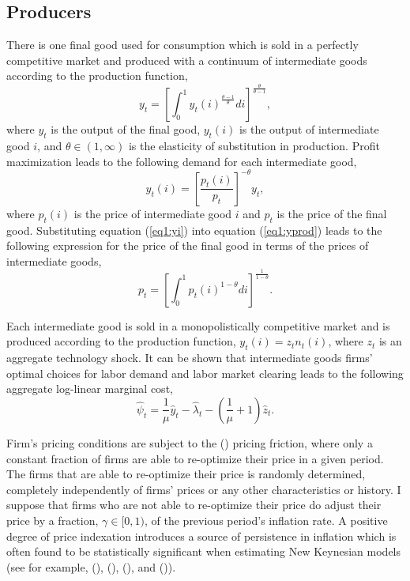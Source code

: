 \documentclass[11pt]{article}
\newcommand{\beq}{\begin{equation}}
\newcommand{\eeq}{\end{equation}}
\newcommand{\citee}[1]{\citeauthor*{#1} (\citeyear{#1})}
\newcommand{\h}[1]{\hat{#1}}
\begin{document}
\subsection{Producers}
There is one final good used for consumption which is sold in a perfectly competitive market and produced with a continuum of intermediate goods according to the production function,
\beq \label{eq1:yprod} y_t = \left[ \int_0^1 y_t(i)^{\frac{\theta-1}{\theta}} di \right]^{\frac{\theta}{\theta-1}}, \eeq
where $y_t$ is the output of the final good, $y_t(i)$ is the output of intermediate good $i$, and $\theta\in(1,\infty)$ is the elasticity of substitution in production.  Profit maximization leads to the following demand for each intermediate good,
\beq \label{eq1:yi} y_t(i) = \left[ \frac{p_t(i)}{p_t} \right]^{-\theta} y_t, \eeq
where $p_t(i)$ is the price of intermediate good $i$ and $p_t$ is the price of the final good.  Substituting equation (\ref{eq1:yi}) into equation (\ref{eq1:yprod}) leads to the following expression for the price of the final good in terms of the prices of intermediate goods,
\beq \label{eq1:pfinal} p_t = \left[ \int_0^1 p_t(i)^{1-\theta} di \right]^{\frac{1}{1-\theta}}. \eeq

Each intermediate good is sold in a monopolistically competitive market and is produced according to the production function, $y_t(i) = z_t n_t(i)$, where $z_t$ is an aggregate technology shock.  It can be shown that intermediate goods firms' optimal choices for labor demand and labor market clearing leads to the following aggregate log-linear marginal cost,
\beq \label{eq1:mc2} \h{\psi}_t = \frac{1}{\mu} \h{y}_t - \h{\lambda}_t - \left(\frac{1}{\mu} + 1\right) \h{z}_t. \eeq

Firm's pricing conditions are subject to the \citee{calvo1983} pricing friction, where only a constant fraction of firms are able to re-optimize their price in a given period.  The firms that are able to re-optimize their price is randomly determined, completely independently of firms' prices or any other characteristics or history.  I suppose that firms who are not able to re-optimize their price do adjust their price by a fraction, $\gamma \in [0,1)$, of the previous period's inflation rate.  A positive degree of price indexation introduces a source of persistence in inflation which is often found to be statistically significant when estimating New Keynesian models (see for example, \citeauthor*{smetswouters2005} (\citeyear{smetswouters2003}), (\citeyear{smetswouters2003}), (\citeyear{smetswouters2007}), and \citee{milani2007}).
\end{document}
